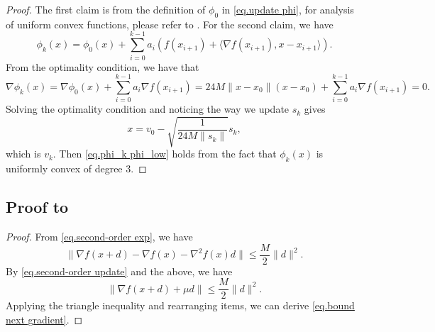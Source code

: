 \documentclass{article}
\begin{document}
\begin{proof}
    The first claim is from the definition of $\phi_0$ in \eqref{eq.update phi}, for analysis of uniform convex functions, please refer to \cite[Section 4.2.2]{nesterov2018lectures}. For the second claim, we have
    \begin{equation}
        \label{eq.phi recursive}
        \phi_k(x) = \phi_0(x)+\sum_{i=0}^{k-1}a_i\left (f(x_{i+1})+\langle \nabla f(x_{i+1}),x-x_{i+1}\rangle \right).
    \end{equation}
    From the optimality condition, we have that
    \begin{equation*}
        \nabla \phi_k(x) = \nabla \phi_0(x)+ \sum_{i=0}^{k-1} a_i\nabla f(x_{i+1}) = 24M\|x-x_0\|(x-x_0)+\sum_{i=0}^{k-1} a_i\nabla f(x_{i+1}) =0.
    \end{equation*}
    Solving the optimality condition and noticing the way we update $s_k$ gives
    \begin{equation*}
        x = v_0 - \sqrt{\frac{1}{24M\|s_{k}\|}}s_{k},
    \end{equation*}
    which is $v_k$. Then \eqref{eq.phi_k phi_low} holds from the fact that $\phi_k(x)$ is uniformly convex of degree 3.
\end{proof}
\subsection*{Proof to~}
\begin{proof}
    From \eqref{eq.second-order exp}, we have
    \begin{equation*}
        \|\nabla f(x+d)- \nabla f(x) -\nabla ^2 f(x) d\| \leq \frac{M}{2}\|d\|^2.
    \end{equation*}
    By \eqref{eq.second-order update} and the above, we have
    \begin{equation}\label{eq.bounded by squared step}
        \|\nabla f(x+d)+\mu d\| \leq \frac{M}{2}\|d\|^2.
    \end{equation}
    Applying the triangle inequality and rearranging items, we can derive \eqref{eq.bound next gradient}.
\end{proof}
\end{document}
